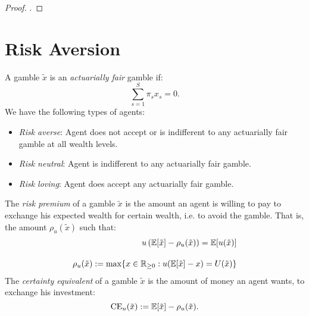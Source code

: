 \documentclass[twoside]{article}
\begin{document}
\begin{proof}
    .
\end{proof}

\section{Risk Aversion}
A gamble $\tilde{x}$ is an \textit{actuarially fair} gamble if:
\[
    \sum^S_{s=1}\pi_s x_s = 0.
\]
We have the following types of agents:
\begin{itemize}
    \item \textit{Risk averse}: Agent does not accept or is indifferent to any actuarially fair gamble at all wealth levels.
    \item \textit{Risk neutral}: Agent is indifferent to any actuarially fair gamble.
    \item \textit{Risk loving}: Agent does accept any actuarially fair gamble.
\end{itemize}
The \textit{risk premium} of a gamble $\tilde{x}$ is the amount an agent is willing to pay to exchange his expected wealth for certain wealth, i.e. to avoid the gamble. That is, the amount $\rho_u(\tilde{x})$ such that:
\begin{align*}
    u\left(\mathbb{E}[\tilde{x}] - \rho_u(\tilde{x})\right) = \mathbb{E}[u(\tilde{x})] \\[10pt]
    \rho_u(\tilde{x}) := \max \{x \in \mathbb{R}_{\geq0} : u(\mathbb{E}[\tilde{x}] - x) = U(\tilde{x})\}
\end{align*}
The \textit{certainty equivalent} of a gamble $\tilde{x}$ is the amount of money an agent wants, to exchange his investment:
\[
    \text{CE}_u(\tilde{x}) := \mathbb{E}[\tilde{x}] - \rho_u(\tilde{x}).
\]
\end{document}

